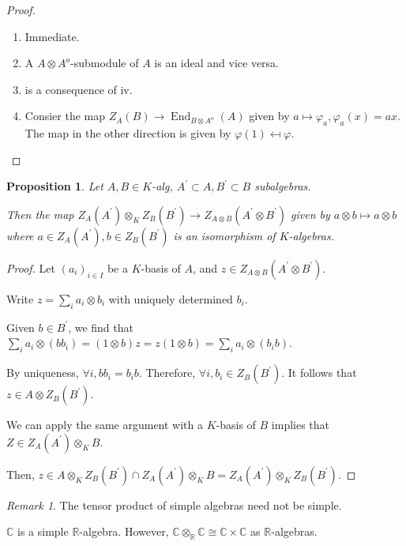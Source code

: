 \documentclass{article}
\theoremstyle{definition}
\theoremstyle{plain}
\newtheorem{proposition}[theorem]{Proposition}
\theoremstyle{remark}
\newtheorem*{remark*}{Remark}
\begin{document}
    \begin{proof}
        \begin{enumerate}[label=\roman*)]
            \item Immediate.
            \item A \(A \otimes A^o\)-submodule of \(A\) is an ideal and vice versa.
            \item is a consequence of iv.
            \item Consier the map \(Z_A(B) \to \operatorname{End}_{B \otimes A^o}(A)\) given by \(a \mapsto \varphi_a, \varphi_a(x) = ax\). The map in the other direction is given by \(\varphi(1) \mapsfrom \varphi\).  
        \end{enumerate} 
    \end{proof}

    \begin{proposition}
        Let \(A,B \in K\)-alg, \(A^{\prime} \subset A, B^{\prime} \subset B\) subalgebras.

        Then the map \(Z_A(A^{\prime}) \otimes_K Z_B(B^{\prime}) \to Z_{A \otimes B} (A^{\prime} \otimes B^{\prime})\) given by \(a \otimes b \mapsto a \otimes b\) where \(a\in Z_A(A^{\prime}), b\in Z_B(B^{\prime})\) is an isomorphism of \(K\)-algebras.
    \end{proposition}

    \begin{proof}
        Let \((a_i)_{i\in I}\) be a \(K\)-basis of \(A\), and \(z\in Z_{A \otimes B}(A^{\prime} \otimes B^{\prime})\).

        Write \(z = \sum_{i} a_i \otimes b_i\) with uniquely determined \(b_i\).

        Given \(b\in B^{\prime}\), we find that \(\sum_{i} a_i \otimes (bb_i) = (1 \otimes b) z = z (1 \otimes b) = \sum_{i} a_i \otimes (b_i b)\).
        
        By uniqueness, \(\forall i, bb_i = b_i b\). Therefore, \(\forall i, b_i \in Z_B(B^{\prime}).\) It follows that \(z \in A \otimes Z_B(B^{\prime})\).

        We can apply the same argument with a \(K\)-basis of \(B\) implies that \(Z \in Z_A(A^{\prime}) \otimes_K B\).

        Then, \(z\in A \otimes_K Z_B(B^{\prime}) \cap Z_A(A^{\prime}) \otimes_K B = Z_A(A^{\prime}) \otimes_K Z_B(B^{\prime})\).
    \end{proof}

    \begin{remark*}
        The tensor product of simple algebras need not be simple.

        \(\mathbb{C}\) is a simple \(\mathbb{R}\)-algebra. However, \(\mathbb{C} \otimes_\mathbb{R} \mathbb{C} \cong \mathbb{C} \times \mathbb{C}\) as \(\mathbb{R}\)-algebras.
    \end{remark*}
\end{document}
